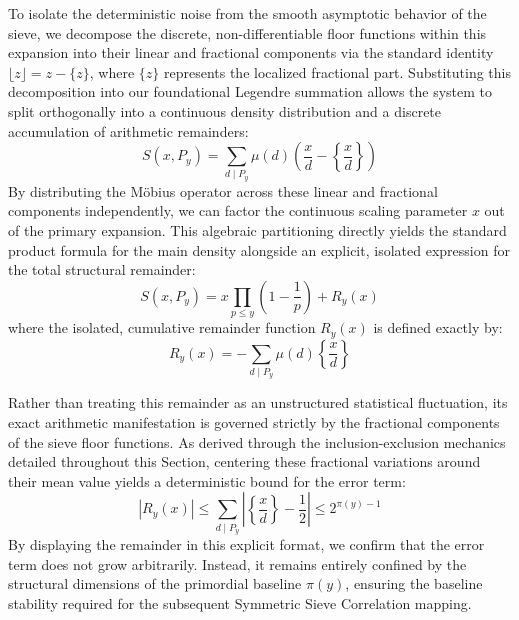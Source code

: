 \documentclass[sn-mathphys-num, pdflatex]{sn-jnl}
\begin{document}
To isolate the deterministic noise from the smooth asymptotic behavior of the sieve, we decompose the discrete, non-differentiable floor functions within this expansion into their linear and fractional components via the standard identity $\lfloor z \rfloor = z - \{z\}$, where $\{z\}$ represents the localized fractional part. Substituting this decomposition into our foundational Legendre summation allows the system to split orthogonally into a continuous density distribution and a discrete accumulation of arithmetic remainders:
\begin{equation*}
S(x, P_y) = \sum_{d \mid P_y} \mu(d) \left( \frac{x}{d} - \left\{ \frac{x}{d} \right\} \right)
\end{equation*}
By distributing the Möbius operator across these linear and fractional components independently, we can factor the continuous scaling parameter $x$ out of the primary expansion. This algebraic partitioning directly yields the standard product formula for the main density alongside an explicit, isolated expression for the total structural remainder:
\begin{equation*}
S(x, P_y) = x \prod_{p \le y} \left(1 - \frac{1}{p}\right) + R_y(x)
\end{equation*}
where the isolated, cumulative remainder function $R_y(x)$ is defined exactly by:
\begin{equation*}
R_y(x) = -\sum_{d \mid P_y} \mu(d) \left\{ \frac{x}{d} \right\}
\end{equation*}

Rather than treating this remainder as an unstructured statistical fluctuation, its exact arithmetic manifestation is governed strictly by the fractional components of the sieve floor functions. As derived through the inclusion-exclusion mechanics detailed throughout this Section, centering these fractional variations around their mean value yields a deterministic bound for the error term:
\begin{equation*}
|R_y(x)| \le \sum_{d \mid P_y} \left| \left\{ \frac{x}{d} \right\} - \frac{1}{2} \right| \le 2^{\pi(y) - 1}
\end{equation*}
By displaying the remainder in this explicit format, we confirm that the error term does not grow arbitrarily. Instead, it remains entirely confined by the structural dimensions of the primordial baseline $\pi(y)$, ensuring the baseline stability required for the subsequent Symmetric Sieve Correlation mapping. 
\end{document}
